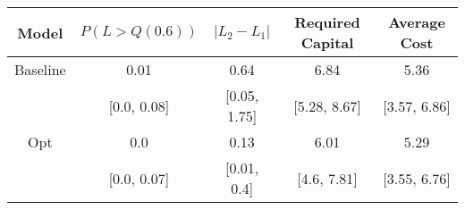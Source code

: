 \begin{tabular}{ccccc}
\toprule
   Model & $P(L > Q(0.6))$ & $|L_2 - L_1|$ & Required Capital & Average Cost \\
\midrule
Baseline &            0.01 &          0.64 &             6.84 &         5.36 \\
         &     [0.0, 0.08] &  [0.05, 1.75] &     [5.28, 8.67] & [3.57, 6.86] \\
     Opt &             0.0 &          0.13 &             6.01 &         5.29 \\
         &     [0.0, 0.07] &   [0.01, 0.4] &      [4.6, 7.81] & [3.55, 6.76] \\
\bottomrule
\end{tabular}
